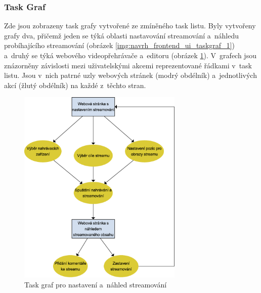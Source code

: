 \documentclass[thesis=M,czech]{FITthesis}[2012/06/26]
\begin{document}
\subsubsection{Task Graf} \label{subsubsec:navrh_frontend_ui_taskgraf}
Zde jsou zobrazeny task grafy vytvořené ze zmíněného task listu. Byly vytvořeny grafy dva, přičemž jeden se týká oblasti nastavování streamování a~náhledu probíhajícího streamování (obrázek \ref{img:navrh_frontend_ui_taskgraf_1}) a~druhý se týká webového videopřehrávače a~editoru (obrázek \ref{img:navrh_frontend_ui_taskgraf_2}). V~grafech jsou znázorněny závislosti mezi uživatelskými akcemi reprezentované řádkami v~task listu. Jsou v~nich patrné uzly webových stránek (modrý obdélník) a~jednotlivých akcí (žlutý obdélník) na každé z~těchto stran.
\\
\begin{figure}[h]\centering
	\includegraphics[width=0.7\textwidth]{images/ui_task_flow_1.eps}
	\caption{Task graf pro nastavení a~náhled streamování}\label{img:navrh_frontend_ui_taskgraf_2}
\end{figure}
\\
\end{document}
